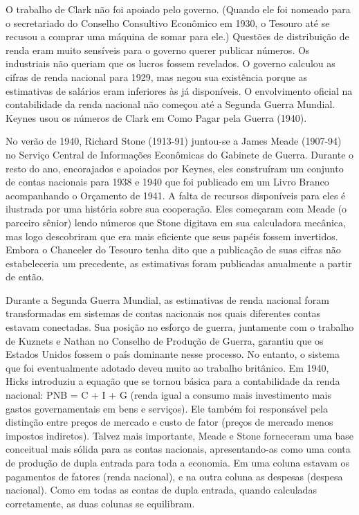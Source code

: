 \documentclass[12pt]{article}
\begin{document}
O trabalho de Clark não foi apoiado pelo governo. (Quando ele foi nomeado para o secretariado do Conselho Consultivo Econômico em 1930, o Tesouro até se recusou a comprar uma máquina de somar para ele.) Questões de distribuição de renda eram muito sensíveis para o governo querer publicar números. Os industriais não queriam que os lucros fossem revelados. O governo calculou as cifras de renda nacional para 1929, mas negou sua existência porque as estimativas de salários eram inferiores às já disponíveis. O envolvimento oficial na contabilidade da renda nacional não começou até a Segunda Guerra Mundial. Keynes usou os números de Clark em Como Pagar pela Guerra (1940).

No verão de 1940, Richard Stone (1913-91) juntou-se a James Meade (1907-94) no Serviço Central de Informações Econômicas do Gabinete de Guerra. Durante o resto do ano, encorajados e apoiados por Keynes, eles construíram um conjunto de contas nacionais para 1938 e 1940 que foi publicado em um Livro Branco acompanhando o Orçamento de 1941. A falta de recursos disponíveis para eles é ilustrada por uma história sobre sua cooperação. Eles começaram com Meade (o parceiro sênior) lendo números que Stone digitava em sua calculadora mecânica, mas logo descobriram que era mais eficiente que seus papéis fossem invertidos. Embora o Chanceler do Tesouro tenha dito que a publicação de suas cifras não estabeleceria um precedente, as estimativas foram publicadas anualmente a partir de então.

Durante a Segunda Guerra Mundial, as estimativas de renda nacional foram transformadas em sistemas de contas nacionais nos quais diferentes contas estavam conectadas. Sua posição no esforço de guerra, juntamente com o trabalho de Kuznets e Nathan no Conselho de Produção de Guerra, garantiu que os Estados Unidos fossem o país dominante nesse processo. No entanto, o sistema que foi eventualmente adotado deveu muito ao trabalho britânico. Em 1940, Hicks introduziu a equação que se tornou básica para a contabilidade da renda nacional: PNB = C + I + G (renda igual a consumo mais investimento mais gastos governamentais em bens e serviços). Ele também foi responsável pela distinção entre preços de mercado e custo de fator (preços de mercado menos impostos indiretos). Talvez mais importante, Meade e Stone forneceram uma base conceitual mais sólida para as contas nacionais, apresentando-as como uma conta de produção de dupla entrada para toda a economia. Em uma coluna estavam os pagamentos de fatores (renda nacional), e na outra coluna as despesas (despesa nacional). Como em todas as contas de dupla entrada, quando calculadas corretamente, as duas colunas se equilibram.
\end{document}
